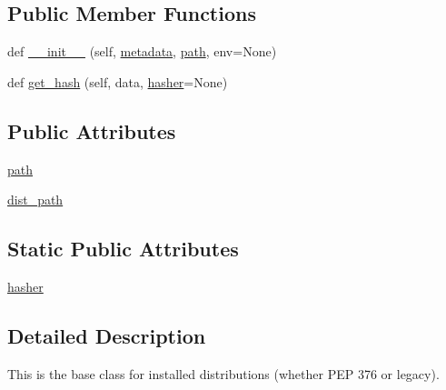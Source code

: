 \subsection*{Public Member Functions}
\begin{DoxyCompactItemize}
\item 
def \hyperlink{classpip_1_1__vendor_1_1distlib_1_1database_1_1BaseInstalledDistribution_a3cf0dbeeadaece59290525cfd71c8164}{\+\_\+\+\_\+init\+\_\+\+\_\+} (self, \hyperlink{classpip_1_1__vendor_1_1distlib_1_1database_1_1Distribution_adda9f0db4ba50d2a3b8dd421e576fb79}{metadata}, \hyperlink{classpip_1_1__vendor_1_1distlib_1_1database_1_1BaseInstalledDistribution_aa37afc6e1557b041e3e2bb7d5c3eb4ab}{path}, env=None)
\item 
def \hyperlink{classpip_1_1__vendor_1_1distlib_1_1database_1_1BaseInstalledDistribution_a0db639ac83f057f61eae7b8c6a38d603}{get\+\_\+hash} (self, data, \hyperlink{classpip_1_1__vendor_1_1distlib_1_1database_1_1BaseInstalledDistribution_af39b5ee3d049a88bf0cfe1ce69e8ef62}{hasher}=None)
\end{DoxyCompactItemize}
\subsection*{Public Attributes}
\begin{DoxyCompactItemize}
\item 
\hyperlink{classpip_1_1__vendor_1_1distlib_1_1database_1_1BaseInstalledDistribution_aa37afc6e1557b041e3e2bb7d5c3eb4ab}{path}
\item 
\hyperlink{classpip_1_1__vendor_1_1distlib_1_1database_1_1BaseInstalledDistribution_ab17d173eea8811a1ccdb286de7cf6ff7}{dist\+\_\+path}
\end{DoxyCompactItemize}
\subsection*{Static Public Attributes}
\begin{DoxyCompactItemize}
\item 
\hyperlink{classpip_1_1__vendor_1_1distlib_1_1database_1_1BaseInstalledDistribution_af39b5ee3d049a88bf0cfe1ce69e8ef62}{hasher}
\end{DoxyCompactItemize}


\subsection{Detailed Description}
\begin{DoxyVerb}This is the base class for installed distributions (whether PEP 376 or
legacy).
\end{DoxyVerb}
 

